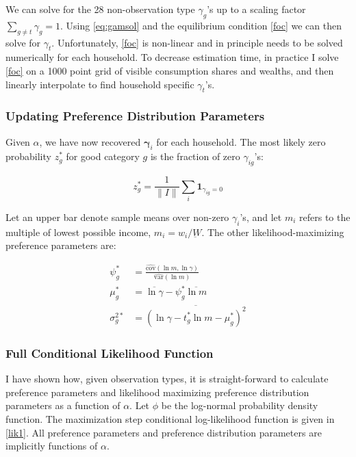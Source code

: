 We can solve for the 28 non-observation type $\gamma_g$'s up to a scaling factor $\sum_{g\neq t}\gamma_g = 1$.  Using \eqref{eq:gamsol} and the equilibrium condition \eqref{foc} we can then solve for $\gamma_t$.  Unfortunately, \eqref{foc} is non-linear and in principle needs to be solved numerically for each household.  To decrease estimation time, in practice I solve \eqref{foc} on a 1000 point grid of visible consumption shares and wealths, and then linearly interpolate to find household specific $\gamma_t$'s.

\subsubsection{Updating Preference Distribution Parameters}

Given $\alpha$, we have now recovered $\boldsymbol{\gamma}_i$ for each household.  The most likely zero probability $z_g^*$ for good category $g$ is the fraction of zero $\gamma_{ig}$'s:

\begin{equation}
    z_g^* = \frac{1}{\|I\|} \sum_{i} \mathbf{1}_{\gamma_{ig} = 0} \nonumber
\end{equation}

Let an upper bar denote sample means over non-zero $\gamma_i$'s, and let $m_i$ refers to the multiple of lowest possible income, $m_i = w_i/\underbar{W}$.  The other likelihood-maximizing preference parameters are:

\begin{align}
    \psi_g^* &= \frac{\hat{\mbox{cov}}(\ln m, \ln \gamma)}{\hat{\mbox{var}}(\ln m)} \nonumber \\
    \mu_g^* &= \overline{\ln \gamma} - \psi_g^* \overline{\ln m} \nonumber \\
    \sigma_g^{2*} &= \overline{\left(\ln \gamma - t_g^* \ln m - \mu_g^*\right)^2}
\end{align}

\subsubsection{Full Conditional Likelihood Function}

I have shown how, given observation types, it is straight-forward to calculate preference parameters and likelihood maximizing preference distribution parameters as a function of $\alpha$.  Let $\phi$ be the log-normal probability density function.   The maximization step conditional log-likelihood function is given in \eqref{lik1}.  All preference parameters and preference distribution parameters are implicitly functions of $\alpha$.

